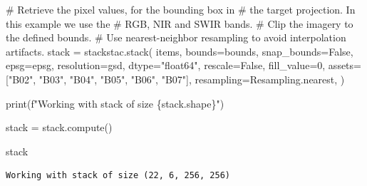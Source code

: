 \documentclass[
  letterpaper,
  DIV=11,
  numbers=noendperiod]{scrreprt}
\newenvironment{Shaded}{\begin{snugshade}}{\end{snugshade}}
\newcommand{\BuiltInTok}[1]{\textcolor[rgb]{0.00,0.23,0.31}{#1}}
\newcommand{\CommentTok}[1]{\textcolor[rgb]{0.37,0.37,0.37}{#1}}
\newcommand{\DecValTok}[1]{\textcolor[rgb]{0.68,0.00,0.00}{#1}}
\newcommand{\NormalTok}[1]{\textcolor[rgb]{0.00,0.23,0.31}{#1}}
\newcommand{\OperatorTok}[1]{\textcolor[rgb]{0.37,0.37,0.37}{#1}}
\newcommand{\SpecialCharTok}[1]{\textcolor[rgb]{0.37,0.37,0.37}{#1}}
\newcommand{\SpecialStringTok}[1]{\textcolor[rgb]{0.13,0.47,0.30}{#1}}
\newcommand{\StringTok}[1]{\textcolor[rgb]{0.13,0.47,0.30}{#1}}
\newcommand{\VariableTok}[1]{\textcolor[rgb]{0.07,0.07,0.07}{#1}}
\begin{document}
\begin{Shaded}
\begin{Highlighting}[]
\CommentTok{\# Retrieve the pixel values, for the bounding box in}
\CommentTok{\# the target projection. In this example we use the}
\CommentTok{\# RGB, NIR and SWIR bands.}
\CommentTok{\# Clip the imagery to the defined bounds.}
\CommentTok{\# Use nearest{-}neighbor resampling to avoid interpolation artifacts.}
\NormalTok{stack }\OperatorTok{=}\NormalTok{ stackstac.stack(}
\NormalTok{    items,}
\NormalTok{    bounds}\OperatorTok{=}\NormalTok{bounds,}
\NormalTok{    snap\_bounds}\OperatorTok{=}\VariableTok{False}\NormalTok{,}
\NormalTok{    epsg}\OperatorTok{=}\NormalTok{epsg,}
\NormalTok{    resolution}\OperatorTok{=}\NormalTok{gsd,}
\NormalTok{    dtype}\OperatorTok{=}\StringTok{"float64"}\NormalTok{,}
\NormalTok{    rescale}\OperatorTok{=}\VariableTok{False}\NormalTok{,}
\NormalTok{    fill\_value}\OperatorTok{=}\DecValTok{0}\NormalTok{,}
\NormalTok{    assets}\OperatorTok{=}\NormalTok{[}\StringTok{"B02"}\NormalTok{, }\StringTok{"B03"}\NormalTok{, }\StringTok{"B04"}\NormalTok{, }\StringTok{"B05"}\NormalTok{, }\StringTok{"B06"}\NormalTok{, }\StringTok{"B07"}\NormalTok{],}
\NormalTok{    resampling}\OperatorTok{=}\NormalTok{Resampling.nearest,}
\NormalTok{)}

\BuiltInTok{print}\NormalTok{(}\SpecialStringTok{f"Working with stack of size }\SpecialCharTok{\{}\NormalTok{stack}\SpecialCharTok{.}\NormalTok{shape}\SpecialCharTok{\}}\SpecialStringTok{"}\NormalTok{)}

\NormalTok{stack }\OperatorTok{=}\NormalTok{ stack.compute()}

\NormalTok{stack}
\end{Highlighting}
\end{Shaded}

\begin{verbatim}
Working with stack of size (22, 6, 256, 256)
\end{verbatim}
\end{document}

